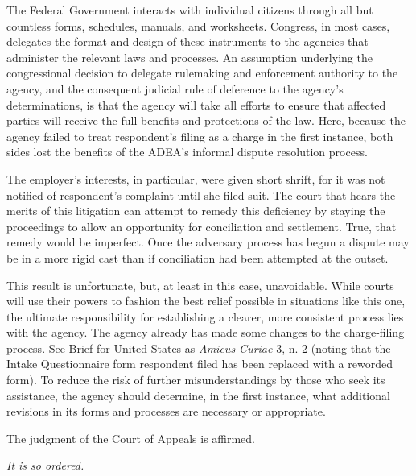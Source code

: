   The Federal Government interacts with individual citizens through
all but countless forms, schedules, manuals, and \newpage  worksheets.
Congress, in most cases, delegates the format and design of these
instruments to the agencies that administer the relevant laws and
processes. An assumption underlying the congressional decision to
delegate rulemaking and enforcement authority to the agency, and the
consequent judicial rule of deference to the agency's determinations,
is that the agency will take all efforts to ensure that affected parties
will receive the full benefits and protections of the law. Here, because
the agency failed to treat respondent's filing as a charge in the
first instance, both sides lost the benefits of the ADEA's informal
dispute resolution process.

  The employer's interests, in particular, were given short shrift,
for it was not notified of respondent's complaint until she filed
suit. The court that hears the merits of this litigation can attempt
to remedy this deficiency by staying the proceedings to allow an
opportunity for conciliation and settlement. True, that remedy would be
imperfect. Once the adversary process has begun a dispute may be in a
more rigid cast than if conciliation had been attempted at the outset.

  This result is unfortunate, but, at least in this case, unavoidable.
While courts will use their powers to fashion the best relief
possible in situations like this one, the ultimate responsibility for
establishing a clearer, more consistent process lies with the agency.
The agency already has made some changes to the charge-filing process.
See Brief for United States as \emph{Amicus Curiae} 3, n. 2 (noting that
the Intake Questionnaire form respondent filed has been replaced with
a reworded form). To reduce the risk of further misunderstandings
by those who seek its assistance, the agency should determine, in the
first instance, what additional revisions in its forms and processes are
necessary or appropriate.

  The judgment of the Court of Appeals is affirmed.

\begin{flushright}\emph{It is so ordered.}\end{flushright}
